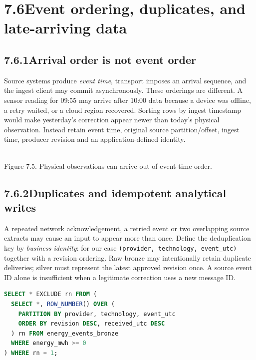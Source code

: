 \documentclass[11pt,twoside]{article}
\newcommand{\topic}[2]{\subsection*{#1\quad #2}}
\begin{document}
\section*{7.6\quad Event ordering, duplicates, and late-arriving data}
\topic{7.6.1}{Arrival order is not event order}
Source systems produce \emph{event time}, transport imposes an arrival sequence, and the ingest client may commit asynchronously. These orderings are different. A sensor reading for 09:55 may arrive after 10:00 data because a device was offline, a retry waited, or a cloud region recovered. Sorting rows by ingest timestamp would make yesterday's correction appear newer than today's physical observation. Instead retain event time, original source partition/offset, ingest time, producer revision and an application-defined identity.
\begin{center}\\{\fontsize{8}{9.2}\selectfont\color{inkgray}Figure 7.5. Physical observations can arrive out of event-time order.}\end{center}
\topic{7.6.2}{Duplicates and idempotent analytical writes}
A repeated network acknowledgement, a retried event or two overlapping source extracts may cause an input to appear more than once. Define the deduplication key by \emph{business identity}: for our case \texttt{(provider, technology, event\_utc)} together with a revision ordering. Raw bronze may intentionally retain duplicate deliveries; silver must represent the latest approved revision once. A source event ID alone is insufficient when a legitimate correction uses a new message ID.
\begin{lstlisting}[language=SQL,caption={Select approved latest revisions at the analytical grain.}]
SELECT * EXCLUDE rn FROM (
  SELECT *, ROW_NUMBER() OVER (
    PARTITION BY provider, technology, event_utc
    ORDER BY revision DESC, received_utc DESC
  ) rn FROM energy_events_bronze
  WHERE energy_mwh >= 0
) WHERE rn = 1;
\end{lstlisting}
\end{document}

